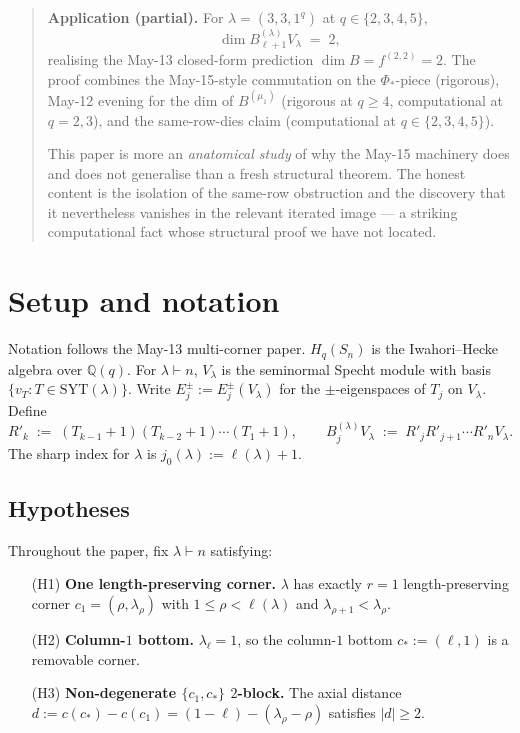 \documentclass[11pt]{article}
\theoremstyle{definition}
\begin{document}
\begin{abstract}
\textbf{Application (partial).} For $\lambda = (3, 3, 1^q)$ at
$q \in \{2, 3, 4, 5\}$,
\[
   \dim B_{\ell+1}^{(\lambda)} V_\lambda \;=\; 2,
\]
realising the May-13 closed-form prediction
$\dim B = f^{(2, 2)} = 2$. The proof combines the May-15-style
commutation on the $\Phi_*$-piece (rigorous), May-12 evening for the
dim of $B^{(\mu_1)}$ (rigorous at $q \ge 4$, computational at $q = 2, 3$),
and the same-row-dies claim (computational at $q \in \{2, 3, 4, 5\}$).

This paper is more an \emph{anatomical study} of why the May-15
machinery does and does not generalise than a fresh structural theorem.
The honest content is the isolation of the same-row obstruction and
the discovery that it nevertheless vanishes in the relevant iterated
image — a striking computational fact whose structural proof we have
not located.
\end{abstract}

\section{Setup and notation}\label{sec:setup}

Notation follows the May-13 multi-corner paper. $H_q(S_n)$ is the
Iwahori--Hecke algebra over $\mathbb{Q}(q)$. For $\lambda \vdash n$,
$V_\lambda$ is the seminormal Specht module with basis
$\{v_T : T \in \mathrm{SYT}(\lambda)\}$. Write
$E_j^\pm := E_j^\pm(V_\lambda)$ for the $\pm$-eigenspaces of $T_j$ on
$V_\lambda$. Define
\[
   R'_k \;:=\; (T_{k-1}{+}1)(T_{k-2}{+}1)\cdots(T_1{+}1),
   \qquad
   B_j^{(\lambda)} V_\lambda \;:=\; R'_j R'_{j+1}\cdots R'_n V_\lambda.
\]
The sharp index for $\lambda$ is $j_0(\lambda) := \ell(\lambda) + 1$.

\subsection{Hypotheses}\label{subsec:hypotheses}

Throughout the paper, fix $\lambda \vdash n$ satisfying:

\begin{itemize}[leftmargin=2em,topsep=0.3em,itemsep=0.2em]
\item[(H1)] \textbf{One length-preserving corner.} $\lambda$ has
exactly $r = 1$ length-preserving corner $c_1 = (\rho, \lambda_\rho)$
with $1 \le \rho < \ell(\lambda)$ and $\lambda_{\rho+1} < \lambda_\rho$.
\item[(H2)] \textbf{Column-$1$ bottom.} $\lambda_\ell = 1$, so the
column-$1$ bottom $c_* := (\ell, 1)$ is a removable corner.
\item[(H3)] \textbf{Non-degenerate $\{c_1, c_*\}$ $2$-block.} The
axial distance $d := c(c_*) - c(c_1) = (1 - \ell) - (\lambda_\rho - \rho)$
satisfies $|d| \ge 2$.
\end{itemize}
\end{document}
